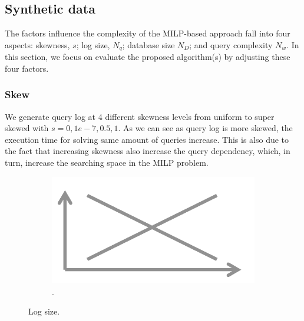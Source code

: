 {\begin{figure}[h]
\end{figure}

\subsection{Synthetic data}
The factors influence the complexity of the MILP-based approach fall 
into four aspects: skewness, $s$; log size, $N_q$; database size $N_D$; and 
query complexity $N_w$. In this section, we focus on 
evaluate the proposed algorithm(s)
by adjusting these four factors. 
\subsubsection{Skew}
We generate query log at 4 different skewness levels from uniform to 
super skewed with $s = 0, 1e-7, 0.5, 1$. As we can see as query log
is more skewed, the execution time for solving same amount of queries 
increase. This is also due to the fact that increasing skewness also
increase the query dependency, which, in turn, increase the searching
space in the MILP problem.
 
 \begin{figure}[h]
\centering
  \begin{subfigure}[t]{.48\columnwidth}
  \includegraphics[width = .95\columnwidth]{figures/placeholder}
  \caption{.}
  \label{f:multiquery} 
  \end{subfigure}
  \caption{Log size. }
\end{figure}

}
